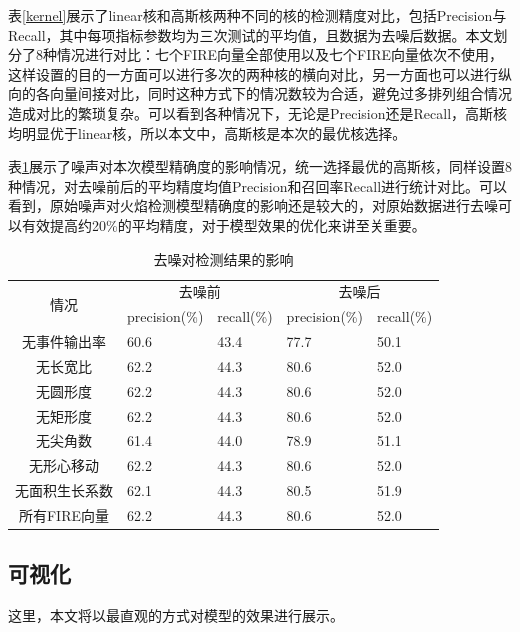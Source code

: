 表\ref{kernel}展示了linear核和高斯核两种不同的核的检测精度对比，包括Precision与Recall，其中每项指标参数均为三次测试的平均值，且数据为去噪后数据。本文划分了8种情况进行对比：七个FIRE向量全部使用以及七个FIRE向量依次不使用，这样设置的目的一方面可以进行多次的两种核的横向对比，另一方面也可以进行纵向的各向量间接对比，同时这种方式下的情况数较为合适，避免过多排列组合情况造成对比的繁琐复杂。可以看到各种情况下，无论是Precision还是Recall，高斯核均明显优于linear核，所以本文中，高斯核是本次的最优核选择。

表\ref{denoise}展示了噪声对本次模型精确度的影响情况，统一选择最优的高斯核，同样设置8种情况，对去噪前后的平均精度均值Precision和召回率Recall进行统计对比。可以看到，原始噪声对火焰检测模型精确度的影响还是较大的，对原始数据进行去噪可以有效提高约20\%的平均精度，对于模型效果的优化来讲至关重要。

\begin{table}[ht]
    \centering
    \caption{去噪对检测结果的影响}
    \begin{tabularx}{\textwidth}{c|X|X|X|X}
    \toprule
    \multicolumn{1}{c|}{\multirow{2}{*}{情况}} & \multicolumn{2}{c|}{去噪前} & \multicolumn{2}{c}{去噪后} \\ \cmidrule(l){2-5} 
    \multicolumn{1}{c|}{}  & precision(\%)     & recall(\%)    & precision(\%)   & recall(\%)  \\
    \midrule
    无事件输出率             &60.6       &43.4       &77.7       &50.1       \\
    无长宽比                &62.2       &44.3       &80.6       &52.0       \\
    无圆形度                &62.2       &44.3       &80.6       &52.0       \\
    无矩形度                &62.2       &44.3       &80.6       &52.0       \\
    无尖角数                &61.4       &44.0       &78.9       &51.1       \\
    无形心移动              &62.2       &44.3       &80.6       &52.0       \\
    无面积生长系数           &62.1       &44.3       &80.5       &51.9       \\
    所有FIRE向量             &62.2       &44.3       &80.6       &52.0       \\
    \bottomrule
    \end{tabularx}
    \label{denoise}
\end{table}

\subsection{可视化}
这里，本文将以最直观的方式对模型的效果进行展示。


